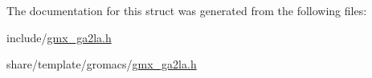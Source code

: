 \-The documentation for this struct was generated from the following files\-:\begin{DoxyCompactItemize}
\item 
include/\hyperlink{include_2gmx__ga2la_8h}{gmx\-\_\-ga2la.\-h}\item 
share/template/gromacs/\hyperlink{share_2template_2gromacs_2gmx__ga2la_8h}{gmx\-\_\-ga2la.\-h}\end{DoxyCompactItemize}
